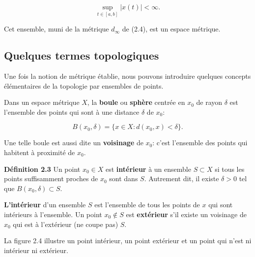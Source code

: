 \documentclass[10pt,twoside,a4paper]{book}
\begin{document}
\begin{equation*}
  \sup_{t \in [a, b]} |x(t)| < \infty.
\end{equation*}

\noindent
Cet ensemble, muni de la métrique $d_\infty$ de (2.4), est un espace métrique.

\subsection{Quelques termes topologiques}
\noindent
Une fois la notion de métrique établie, nous pouvons introduire quelques concepts élémentaires de la topologie par ensembles de points.

Dans un espace métrique $X$, la \textbf{boule} ou \textbf{sphère} centrée en $x_0$ de rayon $\delta$ est l'ensemble des points qui sont à une distance $\delta$ de $x_0$:

\begin{equation}
  B(x_0, \delta) = \{x \in X : d(x_0, x) < \delta\}.
\end{equation}

\noindent
Une telle boule est aussi dite un \textbf{voisinage} de $x_0$: c'est l'ensemble des points qui habitent à proximité de $x_0$.

\vspace{4mm}
\noindent
\textbf{Définition 2.3} Un point $x_0 \in X$ est \textbf{intérieur} à un ensemble $S \subset X$ si tous les points suffisamment proches de $x_0$ sont dans $S$. Autrement dit, il existe $\delta > 0$ tel que $B(x_0, \delta) \subset S$.

\textbf{L'intérieur} d'un ensemble $S$ est l'ensemble de tous les points de $x$ qui sont intérieurs à l'ensemble. Un point $x_0  \notin S$ est \textbf{extérieur} s'il existe un voisinage de $x_0$ qui est à l'extérieur (ne coupe pas) $S$.

\vspace{2mm}
La figure 2.4 illustre un point intérieur, un point extérieur et un point qui n'est ni intérieur ni extérieur.

\end{document}

